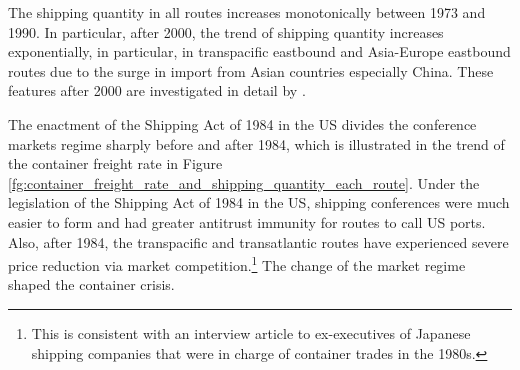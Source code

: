\documentclass[11pt]{article}
\begin{document}
The shipping quantity in all routes increases monotonically between 1973 and 1990. In particular, after 2000, the trend of shipping quantity increases exponentially, in particular, in transpacific eastbound and Asia-Europe eastbound routes due to the surge in import from Asian countries especially China. These features after 2000 are investigated in detail by \cite{jeon2017learning}. 

The enactment of the Shipping Act of 1984 in the US divides the conference markets regime sharply before and after 1984, which is illustrated in the trend of the container freight rate in Figure \ref{fg:container_freight_rate_and_shipping_quantity_each_route}. Under the legislation of the Shipping Act of 1984 in the US, shipping conferences were much easier to form and had greater antitrust immunity for routes to call US ports. Also, after 1984, the transpacific and transatlantic routes have experienced severe price reduction via market competition.\footnote{This is consistent with an interview article to ex-executives of Japanese shipping companies \citep{JapanMaritimeDaily2006} that were in charge of container trades in the 1980s.} The change of the market regime shaped the container crisis.
\end{document}
